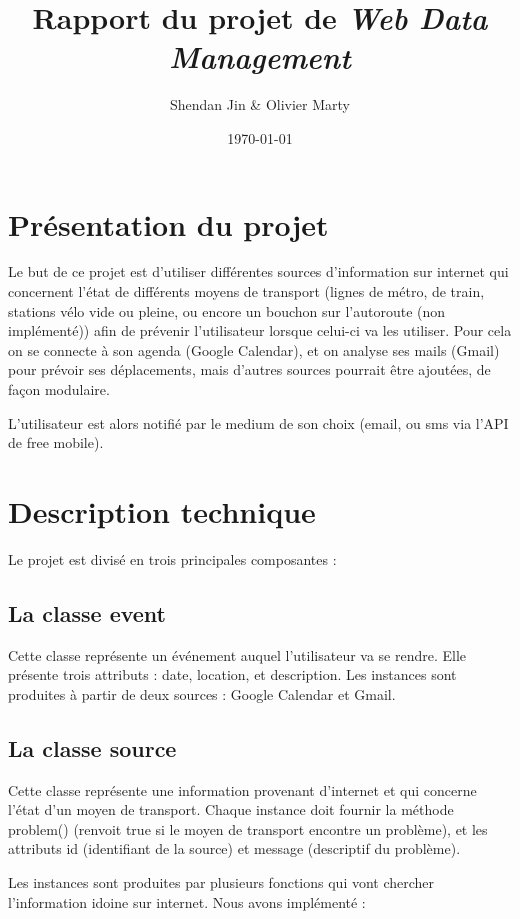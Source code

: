 \documentclass[a4paper, 12pt]{article}
\title{Rapport du projet de \emph{Web Data Management}}
\author{Shendan Jin \& Olivier Marty}
\date\today
\begin{document}
\maketitle

\section{Présentation du projet}

Le but de ce projet est d'utiliser différentes sources d'information sur
internet qui concernent l'état de différents moyens de transport (lignes de
métro, de train, stations vélo vide ou pleine, ou encore un bouchon sur
l'autoroute (non implémenté)) afin de prévenir l'utilisateur lorsque celui-ci va
les utiliser.
Pour cela on se connecte à son agenda (Google Calendar), et on analyse ses mails
(Gmail) pour prévoir ses déplacements, mais d'autres sources pourrait être
ajoutées, de façon modulaire.

L'utilisateur est alors notifié par le medium de son choix (email, ou sms via
l'API de free mobile).

\section{Description technique}

Le projet est divisé en trois principales composantes :

\subsection{La classe event}

Cette classe représente un événement auquel l'utilisateur va se rendre.
Elle présente trois attributs : date, location, et description.
Les instances sont produites à partir de deux sources : Google Calendar et
Gmail.

\subsection{La classe source}

Cette classe représente une information provenant
d'internet et qui concerne l'état d'un moyen de transport.
Chaque instance doit fournir la méthode problem() (renvoit true si le moyen de
transport encontre un problème), et les attributs id (identifiant de la source)
et message (descriptif du problème).

Les instances sont produites par plusieurs fonctions qui vont chercher
l'information idoine sur internet.
Nous avons implémenté :
\end{document}
